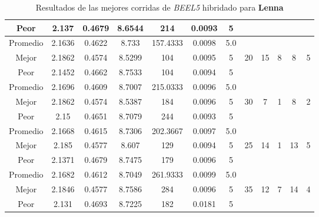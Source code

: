 \begin{table}[h!]
\begin{center}
\begin{tabular}{|c|c|c|c|c|c|c|c|c|c|c|c|}
            \cline{1-7}
            Peor & 2.137 & 0.4679  & 8.6544 & 214 & 0.0093 & 5 &  &  &  &  & \\
        \hline
        \hline
            Promedio  & 2.1636 & 0.4622 & 8.733 & 157.4333 & 0.0098 & 5.0 &  &  &  &  & \\
            \cline{1-7}
            Mejor & 2.1862 & 0.4574  & 8.5299 & 104 & 0.0095 & 5 & 20 & 15 & 8 & 8 & 5\\
            \cline{1-7}
            Peor & 2.1452 & 0.4662  & 8.7533 & 104 & 0.0094 & 5 &  &  &  &  & \\
        \hline
        \hline
            Promedio  & 2.1696 & 0.4609 & 8.7007 & 215.0333 & 0.0096 & 5.0 &  &  &  &  & \\
            \cline{1-7}
            Mejor & 2.1862 & 0.4574  & 8.5387 & 184 & 0.0096 & 5 & 30 & 7 & 1 & 8 & 2\\
            \cline{1-7}
            Peor & 2.15 & 0.4651  & 8.7079 & 244 & 0.0093 & 5 &  &  &  &  & \\
        \hline
        \hline
            Promedio  & 2.1668 & 0.4615 & 8.7306 & 202.3667 & 0.0097 & 5.0 &  &  &  &  & \\
            \cline{1-7}
            Mejor & 2.185 & 0.4577  & 8.607 & 129 & 0.0094 & 5 & 25 & 14 & 1 & 13 & 5\\
            \cline{1-7}
            Peor & 2.1371 & 0.4679  & 8.7475 & 179 & 0.0096 & 5 &  &  &  &  & \\
        \hline
        \hline
            Promedio  & 2.1682 & 0.4612 & 8.7049 & 261.9333 & 0.0099 & 5.0 &  &  &  &  & \\
            \cline{1-7}
            Mejor & 2.1846 & 0.4577  & 8.7586 & 284 & 0.0096 & 5 & 35 & 12 & 7 & 14 & 4\\
            \cline{1-7}
            Peor & 2.131 & 0.4693  & 8.7225 & 182 & 0.0181 & 5 &  &  &  &  & \\
        \hline
        \end{tabular}
        \caption{Resultados de las mejores corridas de \emph{BEEL5} hibridado para {\bf Lenna}}
        \label{tb:tableBEEL5}
    \end{center}
\end{table}
